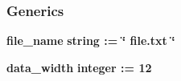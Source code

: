 \subsubsection*{Generics}
 \begin{DoxyCompactItemize}
\item 
{\bf file\+\_\+name} {\bfseries {\bfseries \textcolor{comment}{string}\textcolor{vhdlchar}{ }\textcolor{vhdlchar}{ }\textcolor{vhdlchar}{\+:}\textcolor{vhdlchar}{=}\textcolor{vhdlchar}{ }\textcolor{vhdlchar}{ }\textcolor{vhdlchar}{ }\textcolor{vhdlchar}{ }\textcolor{keyword}{\char`\"{} file.\+txt \char`\"{}}\textcolor{vhdlchar}{ }}}
\item 
{\bf data\+\_\+width} {\bfseries {\bfseries \textcolor{comment}{integer}\textcolor{vhdlchar}{ }\textcolor{vhdlchar}{ }\textcolor{vhdlchar}{\+:}\textcolor{vhdlchar}{=}\textcolor{vhdlchar}{ }\textcolor{vhdlchar}{ } \textcolor{vhdldigit}{12} \textcolor{vhdlchar}{ }}}
\end{DoxyCompactItemize}
